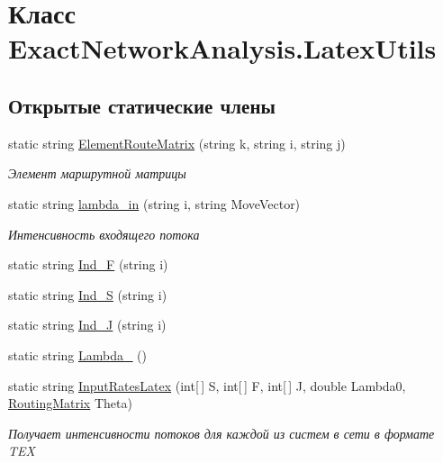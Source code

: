 \hypertarget{class_exact_network_analysis_1_1_latex_utils}{}\section{Класс Exact\+Network\+Analysis.\+Latex\+Utils}
\label{class_exact_network_analysis_1_1_latex_utils}
\subsection*{Открытые статические члены}
\begin{DoxyCompactItemize}
\item 
static string \hyperlink{class_exact_network_analysis_1_1_latex_utils_a1e37aeac3725855d04d3c535c32b4d0a}{Element\+Route\+Matrix} (string k, string i, string j)
\begin{DoxyCompactList}\small\item\em Элемент маршрутной матрицы \end{DoxyCompactList}\item 
static string \hyperlink{class_exact_network_analysis_1_1_latex_utils_a4ecc50cd27c4635af8d66d7065d04c63}{lambda\+\_\+in} (string i, string Move\+Vector)
\begin{DoxyCompactList}\small\item\em Интенсивность входящего потока \end{DoxyCompactList}\item 
static string \hyperlink{class_exact_network_analysis_1_1_latex_utils_a3f9122f70f226f3bec9ee45bfa732e97}{Ind\+\_\+F} (string i)
\item 
static string \hyperlink{class_exact_network_analysis_1_1_latex_utils_ac95cc60afd8891ebd0cd86c09666b715}{Ind\+\_\+S} (string i)
\item 
static string \hyperlink{class_exact_network_analysis_1_1_latex_utils_ac2b059a8183cce618fd9fe62650cc274}{Ind\+\_\+J} (string i)
\item 
static string \hyperlink{class_exact_network_analysis_1_1_latex_utils_a9e2308679b8156cf599890d9b49f02ac}{Lambda\+\_} ()
\item 
static string \hyperlink{class_exact_network_analysis_1_1_latex_utils_ad797122e43579413b4094cb40c0c6348}{Input\+Rates\+Latex} (int\mbox{[}$\,$\mbox{]} S, int\mbox{[}$\,$\mbox{]} F, int\mbox{[}$\,$\mbox{]} J, double Lambda0, \hyperlink{class_network_descriptions_1_1_routing_matrix}{Routing\+Matrix} Theta)
\begin{DoxyCompactList}\small\item\em Получает интенсивности потоков для каждой из систем в сети в формате T\+EX \end{DoxyCompactList}\end{DoxyCompactItemize}


